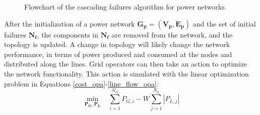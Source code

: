 \documentclass[review]{elsarticle}
\begin{document}
\begin{figure}[h]
	\centering
	\caption{Flowchart of the cascading failures algorithm for power networks.}
	\label{new_opa}
\end{figure}
	After the initialization of a power network $\mathbf{G_p}=(\mathbf{V_p},\mathbf{E_p})$ and the set of initial failures $\mathbf{N_f}$, the components in $\mathbf{N_f}$ are removed from the network, and the topology is updated. A change in topology will likely change the network performance, in terms of power produced and consumed at the nodes and distributed along the lines. Grid operators can then take an action to optimize the network functionality. This action is simulated with the linear optimization problem in Equations \eqref{cost_opa}-\eqref{line_flow_opa}:
	\begin{equation}
	\min_{\mathbf{P_G,P_L}} \;\;\; \sum_{i=1}^{N_G} P_{G,i} -W \sum_{j=1}^{N_L} |P_{L,j}|
	\label{cost_opa}
	\end{equation}
	
\end{document}
